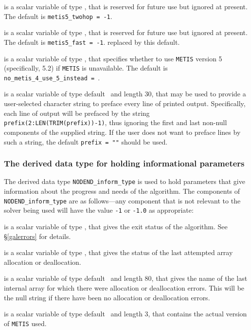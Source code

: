 \documentclass{galahad}
\newcommand{\packagename}{NODEND}
\begin{document}
\begin{description}
 is a scalar variable of type \integer, 
that is reserved for future use but ignored at present.
The default is {\tt metis5\_twohop = -1}.

 is a scalar variable of type \integer, 
that is reserved for future use but ignored at present.
The default is {\tt metis5\_fast = -1}.
replaced by this default.

 is a scalar variable of type \logical, 
that specifies whether to use {\tt METIS} version 5 (specifically, 5.2) 
if {\tt METIS} is unavailable.
The default is {\tt no\_metis\_4\_use\_5\_instead = \true}.

 is a scalar variable of type default \character\
and length 30, that may be used to provide a user-selected
character string to preface every line of printed output.
Specifically, each line of output will be prefaced by the string
{\tt prefix(2:LEN(TRIM(prefix))-1)},
thus ignoring the first and last non-null components of the
supplied string. If the user does not want to preface lines by such
a string, the default {\tt prefix = ""} should be used.

\end{description}


\subsubsection{The derived data type for holding informational
 parameters}\label{typeinform}
The derived data type
{\tt \packagename\_inform\_type}
is used to hold parameters that give information about the progress and needs
of the algorithm. The components of
{\tt \packagename\_inform\_type}
are as follows---any component that is not relevant to the solver being used
will have the value {\tt -1} or {\tt -1.0} as appropriate:

\begin{description}

 is a scalar variable of type \integer, that gives the
exit status of the algorithm.
See \S\ref{galerrors}
for details.

 is a scalar variable of type \integer, that gives
the status of the last attempted array allocation or deallocation.

 is a scalar variable of type default \character\
and length 80, that  gives the name of the last internal array
for which there were allocation or deallocation errors.
This will be the null string if there have been no
allocation or deallocation errors.

 is a scalar variable of type default \character\
and length 3, that contains the actual version of {\tt METIS} used.

\end{description}
\end{document}
